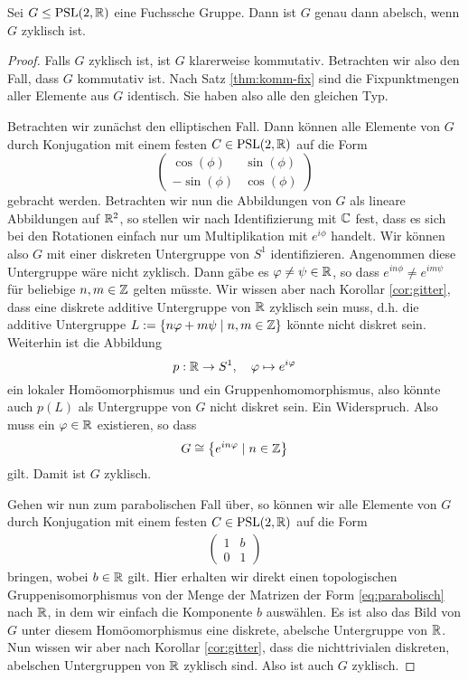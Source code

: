 \begin{thm}
  \label{thm:abelsch-zyklisch}
  Sei $G \leq \operatorname{PSL}(2, \mathbb{R})$ eine Fuchssche Gruppe. Dann ist $G$ genau
  dann abelsch, wenn $G$ zyklisch ist.
\end{thm}

\begin{proof}
  Falls $G$ zyklisch ist, ist $G$ klarerweise kommutativ. Betrachten
  wir also den Fall, dass $G$ kommutativ ist. Nach Satz
  \ref{thm:komm-fix} sind die Fixpunktmengen aller Elemente aus $G$
  identisch. Sie haben also alle den gleichen Typ.

  Betrachten wir zunächst den elliptischen Fall. Dann können alle
  Elemente von $G$ durch Konjugation mit einem festen $C \in \operatorname{PSL}(2,\mathbb{R})$ auf
  die Form
  \[
  \begin{pmatrix}
    \cos(\phi) & \sin(\phi) \\
    -\sin(\phi) & \cos(\phi)
  \end{pmatrix}
  \]
  gebracht werden. Betrachten wir nun die Abbildungen von $G$ als
  lineare Abbildungen auf $\mathbb{R}^2$, so stellen wir nach Identifizierung
  mit $\mathbb{C}$ fest, dass es sich bei den Rotationen einfach nur um
  Multiplikation mit $e^{i\phi}$ handelt. Wir können also $G$ mit
  einer diskreten Untergruppe von $S^1$ identifizieren. Angenommen
  diese Untergruppe wäre nicht zyklisch. Dann gäbe es $\varphi \neq \psi
  \in \mathbb{R}$, so dass $e^{in\phi} \neq e^{im\psi}$ für beliebige $n, m
  \in \mathbb{Z}$ gelten müsste. Wir wissen aber nach Korollar \ref{cor:gitter}, dass
  eine diskrete additive Untergruppe von $\mathbb{R}$ zyklisch sein muss,
  d.h. die additive Untergruppe $L := \{ n \varphi + m \psi \mid n,m \in
  \mathbb{Z}\}$ könnte nicht diskret sein. Weiterhin ist die Abbildung
  \[
  p: \mathbb{R} \rightarrow S^1, \quad \varphi \mapsto e^{i\varphi}
  \]
  ein lokaler Homöomorphismus und ein Gruppenhomomorphismus, also
  könnte auch $p(L)$ als Untergruppe von $G$ nicht diskret sein. Ein
  Widerspruch. Also muss ein $\varphi \in \mathbb{R}$ existieren, so dass
  \[
  G \cong \left \{ e^{in\varphi} \mid n \in \mathbb{Z} \right \}
  \]
  gilt. Damit ist $G$ zyklisch.

  Gehen wir nun zum parabolischen Fall über, so können wir alle
  Elemente von $G$ durch Konjugation mit einem festen $C \in \operatorname{PSL}(2,
  \mathbb{R})$ auf die Form
  \begin{align}
    \label{eq:parabolisch}
  \begin{pmatrix}
    1 & b\\
    0 & 1
  \end{pmatrix}
  \end{align}
  bringen, wobei $b \in \mathbb{R}$ gilt. Hier erhalten wir direkt einen
  topologischen Gruppenisomorphismus von der Menge der Matrizen der Form
  \eqref{eq:parabolisch} nach $\mathbb{R}$, in dem wir einfach die Komponente
  $b$ auswählen. Es ist also das Bild von $G$ unter diesem
  Homöomorphismus eine diskrete, abelsche
  Untergruppe von $\mathbb{R}$. Nun wissen wir aber nach Korollar \ref{cor:gitter},
  dass die nichttrivialen diskreten, abelschen Untergruppen von $\mathbb{R}$
  zyklisch sind. Also ist auch $G$ zyklisch.


\end{proof}
